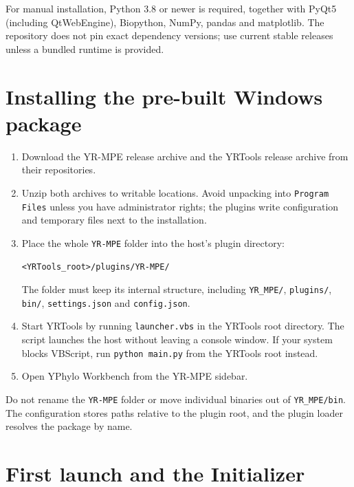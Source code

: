\documentclass[10pt]{report}
\begin{document}
For manual installation, Python 3.8 or newer is required, together with PyQt5
(including QtWebEngine), Biopython, NumPy, pandas and matplotlib. The repository
does not pin exact dependency versions; use current stable releases unless a
bundled runtime is provided.

\section{Installing the pre-built Windows package}

\begin{enumerate}
  \item Download the YR-MPE release archive and the YRTools release archive
        from their repositories.
  \item Unzip both archives to writable locations. Avoid unpacking into
        \texttt{Program Files} unless you have administrator rights; the
        plugins write configuration and temporary files next to the
        installation.
  \item Place the whole \texttt{YR-MPE} folder into the host's plugin
        directory:
        \begin{center}
        \texttt{<YRTools\_root>/plugins/YR-MPE/}
        \end{center}
        The folder must keep its internal structure, including
        \texttt{YR\_MPE/}, \texttt{plugins/}, \texttt{bin/},
        \texttt{settings.json} and \texttt{config.json}.
  \item Start YRTools by running \texttt{launcher.vbs} in the YRTools root
        directory. The script launches the host without leaving a console
        window. If your system blocks VBScript, run \texttt{python main.py}
        from the YRTools root instead.
  \item Open YPhylo Workbench from the YR-MPE sidebar.
\end{enumerate}

\begin{warning}
Do not rename the \texttt{YR-MPE} folder or move individual binaries out of
\texttt{YR\_MPE/bin}. The configuration stores paths relative to the plugin
root, and the plugin loader resolves the package by name.
\end{warning}

\section{First launch and the Initializer}
\end{document}
